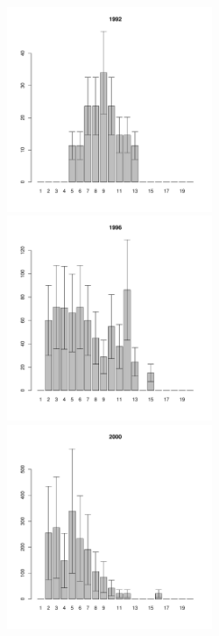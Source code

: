 \documentclass[12pt, a4paper]{article}
\begin{document}
\begin{figure}[h]

\begin{multicols}{3}
\hfill
\includegraphics[width=60mm]{../White_Sea/Luvenga_II_razrez/high_beatch_1992_.pdf}
\hfill
\includegraphics[width=60mm]{../White_Sea/Luvenga_II_razrez/high_beatch_1996_.pdf}
\hfill
\includegraphics[width=60mm]{../White_Sea/Luvenga_II_razrez/high_beatch_2000_.pdf}
\end{multicols}




\end{figure}
\end{document}
